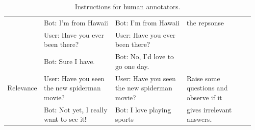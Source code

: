 \begin{table}[th]
\begin{tabular}{cllll}
& Bot: I'm from Hawaii & Bot: I'm from Hawaii & the repsonse\\
&  User: Have you ever been there? &  User: Have you ever been there? & \\
&  Bot: Sure I have. &  Bot: No, I'd love to go one day. & \\
\midrule
Relevance &
 User: Have you seen the new spiderman movie? & 
User: Have you seen the new spiderman movie? &
Raise some questions and observe if it \\
& Bot: Not yet, I really want to see it! &  Bot: I love playing sports & gives irrelevant answers. \\
\bottomrule
\end{tabular}
\caption{Instructions for human annotators.}
\label{tab:human}
\end{table}

%

%

